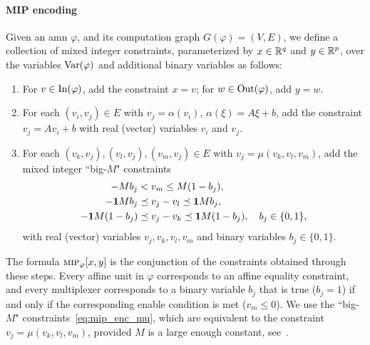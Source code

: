 \documentclass[10pt]{article}
\newcommand{\amn}{\varphi}
\newcommand{\Var}{\mathop{\rm Var}}
\newcommand{\Input}{\mathop{\rm In}}
\newcommand{\Output}{\mathop{\rm Out}}
\newcommand{\mip}{\mbox{\sc mip}}
\theoremstyle{remark}
\theoremstyle{definition}
\theoremstyle{plain}
\begin{document}
\paragraph{MIP encoding}
Given an \acs{amn} $\amn$, and its computation graph $G(\amn)=(V,E)$, we define
a collection of mixed integer constraints, parameterized by $x\in\mathbb{R}^q$ and
$y\in\mathbb{R}^p$, over the variables $\Var(\amn)$ and additional binary
variables as follows:
\begin{enumerate}
	\item For $v\in\Input(\amn)$, add the constraint $x=v$;
	for $w\in\Output(\amn)$, add $y=w$.
	\item For each $(v_i, v_j) \in E$ with $v_j = \alpha(v_i)$,
	$\alpha(\xi) = A \xi + b$, add the constraint $v_j = A v_i + b$ with real
	(vector) variables $v_i$ and $v_j$.
	\item For each $(v_k,v_j), (v_l, v_j), (v_m, v_j) \in E$ with $v_j = \mu(v_k,
	v_l, v_m)$, add the mixed integer ``big-$M$" constraints
	\begin{equation}
		\label{eq:mip_enc_mu}
		\begin{aligned}
			-Mb_j &< v_m \leq M(1-b_j),\\
			-\mathbf 1 Mb_j &\preceq v_j - v_l \preceq \mathbf 1 Mb_j,\\
			-\mathbf 1 M(1-b_j) &\preceq v_j - v_k \preceq \mathbf 1 M(1-b_j), \quad b_j\in\{0,1\},
		\end{aligned}
	\end{equation}
	with real (vector) variables $v_j,v_k,v_l,v_m$ and binary variables $b_j\in\{0,1\}$.
\end{enumerate}

The formula $\mip_\amn[x,y]$ is the conjunction of the constraints
obtained through these steps.
Every affine unit in $\amn$ corresponds to an affine equality
constraint, and every multiplexer corresponds to a binary variable $b_j$ that
is true ($b_j=1$) if and only if the corresponding enable condition is met
($v_m\leq 0$). 
We use the ``big-$M$" constraints~\eqref{eq:mip_enc_mu}, which are equivalent
to the constraint $v_j = \mu(v_k, v_l, v_m)$, provided $M$ is a large enough
constant, see~\cite{Grossmann:2002}.
\end{document}
